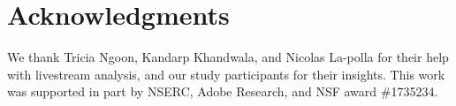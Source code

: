 








\section{Acknowledgments}
We thank Tricia Ngoon, Kandarp Khandwala, and Nicolas La-polla for their help with livestream analysis, and our study participants for their insights. This work was supported in part by NSERC, Adobe Research, and NSF award \#1735234.
